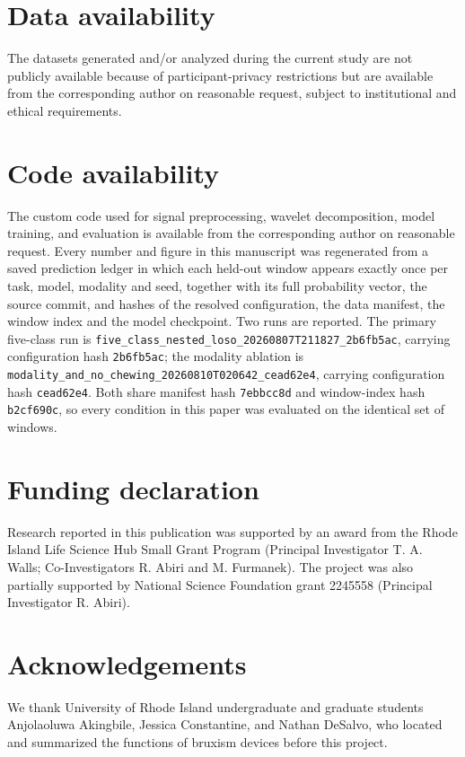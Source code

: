\documentclass[pdflatex,sn-nature,iicol]{sn-jnl}
\begin{document}
\backmatter

\section*{Data availability}
The datasets generated and/or analyzed during the current study are not publicly available because of participant-privacy restrictions but are available from the corresponding author on reasonable request, subject to institutional and ethical requirements.

\section*{Code availability}
The custom code used for signal preprocessing, wavelet decomposition, model training, and evaluation is available from the corresponding author on reasonable request. Every number and figure in this manuscript was regenerated from a saved prediction ledger in which each held-out window appears exactly once per task, model, modality and seed, together with its full probability vector, the source commit, and hashes of the resolved configuration, the data manifest, the window index and the model checkpoint. Two runs are reported. The primary five-class run is \texttt{five\_class\_nested\_loso\_}\allowbreak\texttt{20260807T211827\_2b6fb5ac}, carrying configuration hash \texttt{2b6fb5ac}; the modality ablation is \texttt{modality\_and\_no\_chewing\_}\allowbreak\texttt{20260810T020642\_cead62e4}, carrying configuration hash \texttt{cead62e4}. Both share manifest hash \texttt{7ebbcc8d} and window-index hash \texttt{b2cf690c}, so every condition in this paper was evaluated on the identical set of windows.

\section*{Funding declaration}
Research reported in this publication was supported by an award from the Rhode Island Life Science Hub Small Grant Program (Principal Investigator T. A. Walls; Co-Investigators R. Abiri and M. Furmanek). The project was also partially supported by National Science Foundation grant 2245558 (Principal Investigator R. Abiri).

\section*{Acknowledgements}
We thank University of Rhode Island undergraduate and graduate students Anjolaoluwa Akingbile, Jessica Constantine, and Nathan DeSalvo, who located and summarized the functions of bruxism devices before this project.
\end{document}
